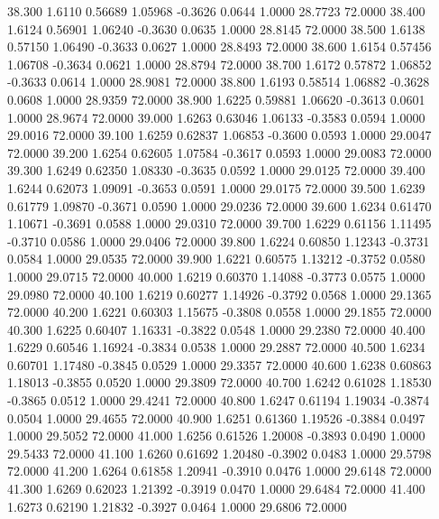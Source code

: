   38.300   1.6110   0.56689   1.05968  -0.3626   0.0644   1.0000  28.7723  72.0000
  38.400   1.6124   0.56901   1.06240  -0.3630   0.0635   1.0000  28.8145  72.0000
  38.500   1.6138   0.57150   1.06490  -0.3633   0.0627   1.0000  28.8493  72.0000
  38.600   1.6154   0.57456   1.06708  -0.3634   0.0621   1.0000  28.8794  72.0000
  38.700   1.6172   0.57872   1.06852  -0.3633   0.0614   1.0000  28.9081  72.0000
  38.800   1.6193   0.58514   1.06882  -0.3628   0.0608   1.0000  28.9359  72.0000
  38.900   1.6225   0.59881   1.06620  -0.3613   0.0601   1.0000  28.9674  72.0000
  39.000   1.6263   0.63046   1.06133  -0.3583   0.0594   1.0000  29.0016  72.0000
  39.100   1.6259   0.62837   1.06853  -0.3600   0.0593   1.0000  29.0047  72.0000
  39.200   1.6254   0.62605   1.07584  -0.3617   0.0593   1.0000  29.0083  72.0000
  39.300   1.6249   0.62350   1.08330  -0.3635   0.0592   1.0000  29.0125  72.0000
  39.400   1.6244   0.62073   1.09091  -0.3653   0.0591   1.0000  29.0175  72.0000
  39.500   1.6239   0.61779   1.09870  -0.3671   0.0590   1.0000  29.0236  72.0000
  39.600   1.6234   0.61470   1.10671  -0.3691   0.0588   1.0000  29.0310  72.0000
  39.700   1.6229   0.61156   1.11495  -0.3710   0.0586   1.0000  29.0406  72.0000
  39.800   1.6224   0.60850   1.12343  -0.3731   0.0584   1.0000  29.0535  72.0000
  39.900   1.6221   0.60575   1.13212  -0.3752   0.0580   1.0000  29.0715  72.0000
  40.000   1.6219   0.60370   1.14088  -0.3773   0.0575   1.0000  29.0980  72.0000
  40.100   1.6219   0.60277   1.14926  -0.3792   0.0568   1.0000  29.1365  72.0000
  40.200   1.6221   0.60303   1.15675  -0.3808   0.0558   1.0000  29.1855  72.0000
  40.300   1.6225   0.60407   1.16331  -0.3822   0.0548   1.0000  29.2380  72.0000
  40.400   1.6229   0.60546   1.16924  -0.3834   0.0538   1.0000  29.2887  72.0000
  40.500   1.6234   0.60701   1.17480  -0.3845   0.0529   1.0000  29.3357  72.0000
  40.600   1.6238   0.60863   1.18013  -0.3855   0.0520   1.0000  29.3809  72.0000
  40.700   1.6242   0.61028   1.18530  -0.3865   0.0512   1.0000  29.4241  72.0000
  40.800   1.6247   0.61194   1.19034  -0.3874   0.0504   1.0000  29.4655  72.0000
  40.900   1.6251   0.61360   1.19526  -0.3884   0.0497   1.0000  29.5052  72.0000
  41.000   1.6256   0.61526   1.20008  -0.3893   0.0490   1.0000  29.5433  72.0000
  41.100   1.6260   0.61692   1.20480  -0.3902   0.0483   1.0000  29.5798  72.0000
  41.200   1.6264   0.61858   1.20941  -0.3910   0.0476   1.0000  29.6148  72.0000
  41.300   1.6269   0.62023   1.21392  -0.3919   0.0470   1.0000  29.6484  72.0000
  41.400   1.6273   0.62190   1.21832  -0.3927   0.0464   1.0000  29.6806  72.0000

